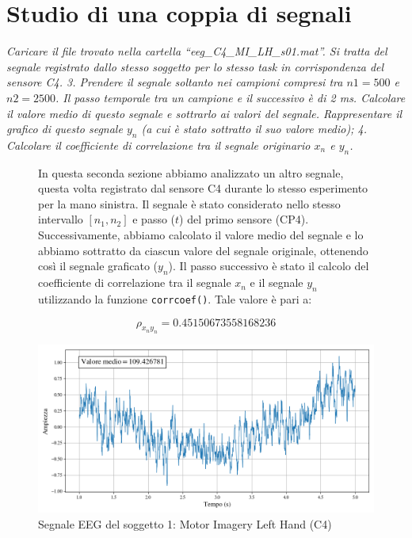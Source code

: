 \documentclass{report}
\begin{document}
\section{Studio di una coppia di segnali}

\textit{Caricare il file trovato nella cartella “eeg\_C4\_MI\_LH\_s01.mat”. Si tratta del segnale registrato dallo stesso soggetto per lo stesso task in corrispondenza del sensore C4. 3. Prendere il segnale soltanto nei campioni compresi tra $n1=500$ e $n2 =2500$. Il
passo temporale tra un campione e il successivo è di 2 ms. Calcolare il valore medio
di questo segnale e sottrarlo ai valori del segnale. Rappresentare il grafico di questo
segnale $y_n$ (a cui è stato sottratto il suo valore medio); 4. Calcolare il coefficiente di correlazione tra il segnale originario $x_n$ e $y_n$.}

\begin{figure}[!h]
\begin{minipage}{0.4\textwidth}
In questa seconda sezione abbiamo analizzato un altro segnale, questa volta registrato dal sensore C4 durante lo stesso esperimento per la mano sinistra. Il segnale è stato considerato nello stesso intervallo $[n_1,n_2]$ e passo ($t$) del primo sensore (CP4). Successivamente, abbiamo calcolato il valore medio del segnale e lo abbiamo sottratto da ciascun valore del segnale originale, ottenendo così il segnale graficato ($y_n$). Il passo successivo è stato il calcolo del coefficiente di correlazione tra il segnale $x_n$ e il segnale $y_n$ utilizzando la funzione \texttt{corrcoef()}\footnotemark. Tale valore è pari a:

$$\boxed{ \rho_{x_ny_n}= 0.45150673558168236}$$
\end{minipage}
\hfill
\hspace{0.5cm}
\begin{minipage}{0.55\textwidth}
\centering
\includegraphics[width=\textwidth]{plot2}
\caption{Segnale EEG del soggetto 1: Motor Imagery Left Hand (C4)}    
\end{minipage}
\end{figure}
\end{document}

